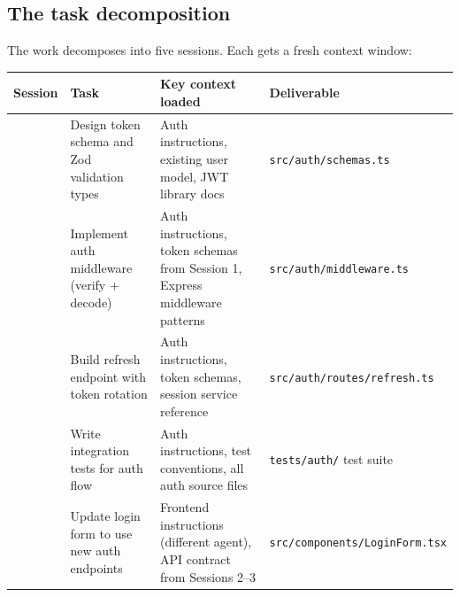 \documentclass[
  a4paper,
  DIV=11,
  numbers=noendperiod]{scrreprt}
\newcounter{none} %
\begin{document}
\subsection{The task decomposition}\label{the-task-decomposition}

The work decomposes into five sessions. Each gets a fresh context
window:

{\def\LTcaptype{none} %
\begin{longtable}[]{@{}
  >{\raggedright\arraybackslash}p{}
  >{\raggedright\arraybackslash}p{}
  >{\raggedright\arraybackslash}p{}
  >{\raggedright\arraybackslash}p{}@{}}
\toprule\noalign{}
\begin{minipage}[b]{\linewidth}\raggedright
Session
\end{minipage} & \begin{minipage}[b]{\linewidth}\raggedright
Task
\end{minipage} & \begin{minipage}[b]{\linewidth}\raggedright
Key context loaded
\end{minipage} & \begin{minipage}[b]{\linewidth}\raggedright
Deliverable
\end{minipage} \\
\midrule\noalign{}
\endhead
\bottomrule\noalign{}
\endlastfoot
1 & Design token schema and Zod validation types & Auth instructions,
existing user model, JWT library docs & \texttt{src/auth/schemas.ts} \\
2 & Implement auth middleware (verify + decode) & Auth instructions,
token schemas from Session 1, Express middleware patterns &
\texttt{src/auth/middleware.ts} \\
3 & Build refresh endpoint with token rotation & Auth instructions,
token schemas, session service reference &
\texttt{src/auth/routes/refresh.ts} \\
4 & Write integration tests for auth flow & Auth instructions, test
conventions, all auth source files & \texttt{tests/auth/} test suite \\
5 & Update login form to use new auth endpoints & Frontend instructions
(different agent), API contract from Sessions 2--3 &
\texttt{src/components/LoginForm.tsx} \\
\end{longtable}
}
\end{document}
